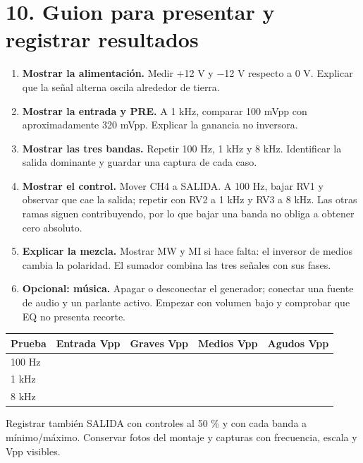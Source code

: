 \documentclass[10pt,a4paper]{article}
\begin{document}
\section{10. Guion para presentar y registrar resultados}
\begin{enumerate}
\item \textbf{Mostrar la alimentación.} Medir +12 V y −12 V respecto a 0 V. Explicar que la señal alterna oscila alrededor de tierra.
\item \textbf{Mostrar la entrada y PRE.} A 1 kHz, comparar 100 mVpp con aproximadamente 320 mVpp. Explicar la ganancia no inversora.
\item \textbf{Mostrar las tres bandas.} Repetir 100 Hz, 1 kHz y 8 kHz. Identificar la salida dominante y guardar una captura de cada caso.
\item \textbf{Mostrar el control.} Mover CH4 a SALIDA. A 100 Hz, bajar RV1 y observar que cae la salida; repetir con RV2 a 1 kHz y RV3 a 8 kHz. Las otras ramas siguen contribuyendo, por lo que bajar una banda no obliga a obtener cero absoluto.
\item \textbf{Explicar la mezcla.} Mostrar MW y MI si hace falta: el inversor de medios cambia la polaridad. El sumador combina las tres señales con sus fases.
\item \textbf{Opcional: música.} Apagar o desconectar el generador; conectar una fuente de audio y un parlante activo. Empezar con volumen bajo y comprobar que EQ no presenta recorte.
\end{enumerate}

\begin{tabularx}{\linewidth}{lXXXX}\toprule Prueba & Entrada Vpp & Graves Vpp & Medios Vpp & Agudos Vpp\\\midrule
100 Hz & & & & \\[5mm]
1 kHz & & & & \\[5mm]
8 kHz & & & & \\[5mm]\bottomrule\end{tabularx}
Registrar también SALIDA con controles al 50 \% y con cada banda a mínimo/máximo. Conservar fotos del montaje y capturas con frecuencia, escala y Vpp visibles.
\end{document}
